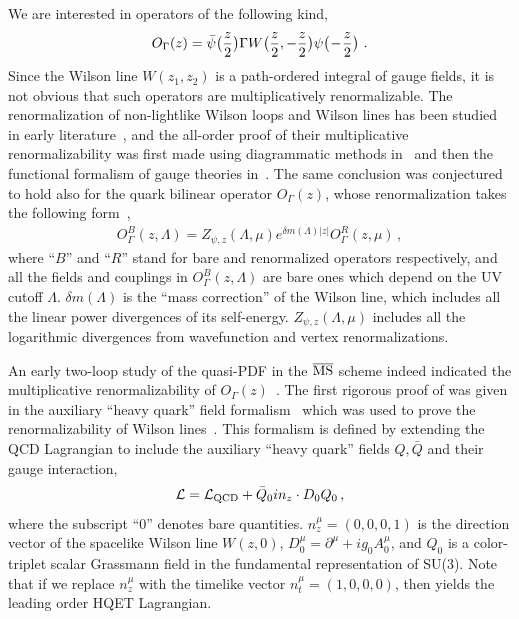 We are interested in operators of the following kind,
\begin{equation}
	O_\Gamma(z)=\bar{\psi}\big({z\over2}\big)\Gamma W\big({z\over2},-{z\over2}\big)\psi\big(\!-\!{z\over2}\big) \ .
\end{equation}
Since the Wilson line $W(z_1,z_2)$ is a path-ordered integral of gauge fields,
it is not obvious that such operators are multiplicatively renormalizable. The renormalization of non-lightlike Wilson loops and Wilson lines has been studied in early literature~\cite{Dotsenko:1979wb,Craigie:1980qs}, and the all-order proof of their multiplicative renormalizability was first made using diagrammatic methods in~\cite{Dotsenko:1979wb,Craigie:1980qs} and then the functional formalism of gauge theories in~\cite{Dorn:1986dt}.
The same conclusion was conjectured to hold also for the quark bilinear operator $O_\Gamma(z)$, whose renormalization takes the following form~\cite{Musch:2010ka,Ishikawa:2016znu,Chen:2016fxx},
\begin{align} \label{eq:schemeren}
	O^B_\Gamma(z,\Lambda)=Z_{\psi,z}(\Lambda,\mu)e^{\delta m(\Lambda)|z|} O^R_\Gamma(z,\mu)\,,
\end{align}
where ``$B$'' and ``$R$'' stand for bare and renormalized operators respectively, and all the fields and couplings in $O^B_\Gamma(z,\Lambda)$ are bare ones which depend on the UV cutoff $\Lambda$. $\delta m(\Lambda)$ is the ``mass correction'' of the Wilson line, which includes all the linear power divergences of its self-energy. $Z_{\psi,z}(\Lambda,\mu)$ includes all the logarithmic divergences from wavefunction and vertex renormalizations.

An early two-loop study of the quasi-PDF in the ${\overline{\rm MS}}$ scheme indeed indicated the multiplicative renormalizability of $O_\Gamma(z)$~\cite{Ji:2015jwa}. The first rigorous proof of  was given in the auxiliary ``heavy quark'' field formalism~\cite{Ji:2017oey,Green:2017xeu} which was used to prove the renormalizability of Wilson lines~\cite{Samuel:1978iy,Gervais:1979fv,Arefeva:1980zd,Dorn:1986dt}. This formalism is defined by extending the QCD Lagrangian to include the auxiliary ``heavy quark'' fields $Q,\bar{Q}$ and their gauge interaction,
\begin{align} \label{eq:hqet}
	{\cal L} = {\cal L}_{\rm QCD} + \bar{Q}_0in_z\cdot D_0 Q_0\,,
\end{align}
where the subscript ``0'' denotes bare quantities. $n_z^\mu=(0,0,0,1)$ is the direction vector of the spacelike Wilson line $W(z,0)$, $D_{0}^\mu = \partial^\mu + ig_0A_{0}^\mu$, and $Q_0$ is a color-triplet scalar Grassmann field in the fundamental representation of SU(3). Note that if we replace $n_z^\mu$ with the timelike vector $n_t^\mu=(1,0,0,0)$, then  yields the leading order HQET Lagrangian.

